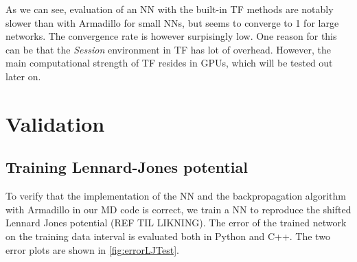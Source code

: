 \documentclass[twoside,english]{uiofysmaster}
\begin{document}
As we can see, evaluation of an NN with the built-in TF methods are notably slower than with Armadillo 
for small NNs, but seems to converge to 1 for large networks. The convergence rate is however surpisingly low. One reason for this
can be that the \textit{Session} environment in TF has lot of overhead. However, the main computational strength of TF resides 
in GPUs, which will be tested out later on. 



\chapter{Validation}

\section{Training Lennard-Jones potential}
To verify that the implementation of the NN and the backpropagation algorithm with Armadillo in our MD code is correct, 
we train a NN to reproduce the shifted Lennard Jones potential (REF TIL LIKNING). 
The error of the trained network on the training data interval is evaluated both in Python and C++. The two error
plots are shown in \autoref{fig:errorLJTest}. 
\end{document}
